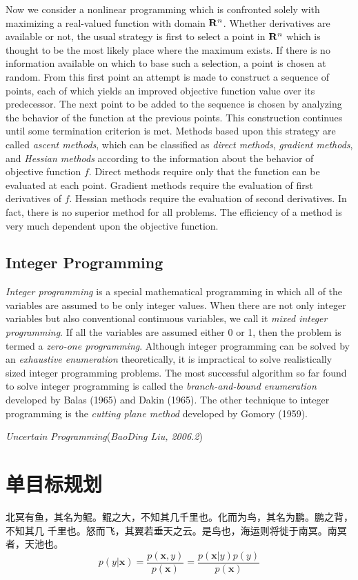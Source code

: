 Now we consider a nonlinear programming which is confronted solely with
maximizing a real-valued function with domain $\mathbf{R}^n$.  Whether derivatives are
available or not, the usual strategy is first to select a point in $\mathbf{R}^n$ which
is thought to be the most likely place where the maximum exists. If there is no
information available on which to base such a selection, a point is chosen at
random. From this first point an attempt is made to construct a sequence of
points, each of which yields an improved objective function value over its
predecessor. The next point to be added to the sequence is chosen by analyzing
the behavior of the function at the previous points. This construction continues
until some termination criterion is met. Methods based upon this strategy are
called {\em ascent methods}, which can be classified as {\em direct methods},
{\em gradient methods}, and {\em Hessian methods} according to the information
about the behavior of objective function $f$. Direct methods require only that
the function can be evaluated at each point. Gradient methods require the
evaluation of first derivatives of $f$. Hessian methods require the evaluation
of second derivatives. In fact, there is no superior method for all
problems. The efficiency of a method is very much dependent upon the objective
function.

\subsection{Integer Programming}

{\em Integer programming} is a special mathematical programming in which all of
the variables are assumed to be only integer values. When there are not only
integer variables but also conventional continuous variables, we call it {\em
  mixed integer programming}. If all the variables are assumed either 0 or 1,
then the problem is termed a {\em zero-one programming}. Although integer
programming can be solved by an {\em exhaustive enumeration} theoretically, it
is impractical to solve realistically sized integer programming problems. The
most successful algorithm so far found to solve integer programming is called
the {\em branch-and-bound enumeration} developed by Balas (1965) and Dakin
(1965). The other technique to integer programming is the {\em cutting plane
  method} developed by Gomory (1959).

\hfill\textit{Uncertain Programming\/}\quad(\textsl{BaoDing Liu, 2006.2})

\section{单目标规划}
北冥有鱼，其名为鲲。鲲之大，不知其几千里也。化而为鸟，其名为鹏。鹏之背，不知其几
千里也。怒而飞，其翼若垂天之云。是鸟也，海运则将徙于南冥。南冥者，天池也。
\begin{equation}\tag*{(123)}
 p(y|\mathbf{x}) = \frac{p(\mathbf{x},y)}{p(\mathbf{x})}=
\frac{p(\mathbf{x}|y)p(y)}{p(\mathbf{x})}
\end{equation}

